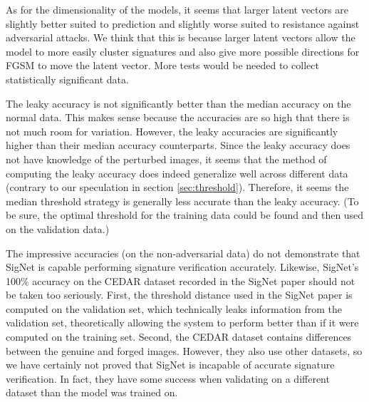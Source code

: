 As for the dimensionality of the models, it seems that larger latent vectors are slightly better suited to prediction and slightly worse suited to resistance against adversarial attacks.
We think that this is because larger latent vectors allow the model to more easily cluster signatures and also give more possible directions for FGSM to move the latent vector.
More tests would be needed to collect statistically significant data.

The leaky accuracy is not significantly better than the median accuracy on the normal data.
This makes sense because the accuracies are so high that there is not much room for variation.
However, the leaky accuracies are significantly higher than their median accuracy counterparts.
Since the leaky accuracy does not have knowledge of the perturbed images, it seems that the method of computing the leaky accuracy does indeed generalize well across different data (contrary to our speculation in section \ref{sec:threshold}).
Therefore, it seems the median threshold strategy is generally less accurate than the leaky accuracy.
(To be sure, the optimal threshold for the training data could be found and then used on the validation data.)

The impressive accuracies (on the non-adversarial data) do not demonstrate that SigNet is capable performing signature verification accurately.
Likewise, SigNet's 100\% accuracy on the CEDAR dataset recorded in the SigNet paper should not be taken too seriously.
First, the threshold distance used in the SigNet paper is computed on the validation set, which technically leaks information from the validation set, theoretically allowing the system to perform better than if it were computed on the training set.
Second, the CEDAR dataset contains differences between the genuine and forged images.
However, they also use other datasets, so we have certainly not proved that SigNet is incapable of accurate signature verification.
In fact, they have some success when validating on a different dataset than the model was trained on\cite{sig_net}.

